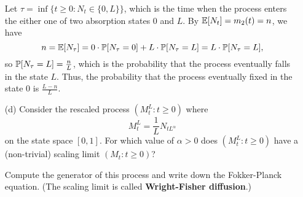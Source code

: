 \begin{enumerate}
        Let $\tau = \inf\{t \ge 0: N_t \in \{0, L\}\}$, which is the time when the process enters the either one of two absorption states $0$ and $L$. By $\mathbb{E} [N_t] = m_2(t) = n$, we have 
        \begin{equation*}
            n = \mathbb{E} [N_\tau] = 0 \cdot \mathbb{P}[N_\tau = 0] + L \cdot \mathbb{P}[N_\tau = L] = L \cdot \mathbb{P}[N_\tau = L],
        \end{equation*}
        so $\mathbb{P}[N_\tau = L] = \frac{n}{L}$, which is the probability that the process eventually falls in the state $L$. Thus, the probability that the process eventually fixed in the state $0$ is $\frac{L - n}{L}$.
        \item[(d)] Consider the rescaled process $(M_t^L: t \ge 0)$ where 
            $$
            M_t^L = \frac{1}{L} N_{t L^\alpha}
            $$
            on the state space $[0,1]$. For which value of $\alpha > 0$ does $(M_t^L: t \ge 0)$ have a (non-trivial) scaling limit $(M_t: t \ge 0)$?

            Compute the generator of this process and write down the Fokker-Planck equation. (The scaling limit is called \textbf{Wright-Fisher diffusion}.)


\end{enumerate}
